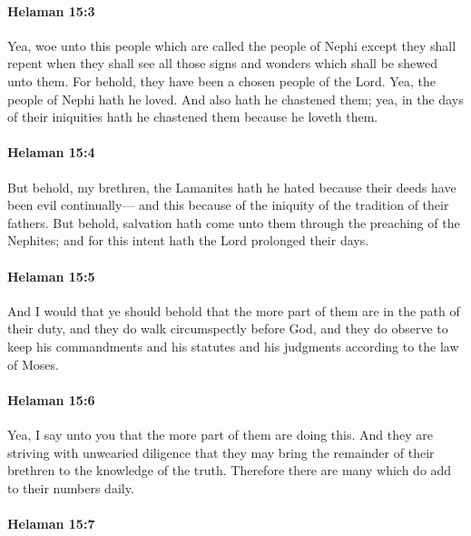 		\paragraph{Helaman 15:3} %
			\label{HELAMAN-15-3}

			Yea, woe unto this people which are called the people of Nephi
			except they shall repent when they shall see all those signs and wonders
			which shall be shewed unto them.
			For behold, they have been a chosen people of the Lord.
			Yea, the people of Nephi hath he loved.
			And also hath he chastened them;
			yea, in the days of their iniquities hath he chastened them because he loveth them.

		\paragraph{Helaman 15:4} %
			\label{HELAMAN-15-4}

			But behold, my brethren, the Lamanites hath he hated
			because their deeds have been evil continually---
			and this because of the iniquity of the tradition of their fathers.
			But behold, salvation hath come unto them through the preaching of the Nephites;
			and for this intent hath the Lord prolonged their days.

		\paragraph{Helaman 15:5} %
			\label{HELAMAN-15-5}

			And I would that ye should behold
			that the more part of them are in the path of their duty,
			and they do walk circumspectly before God,
			and they do observe to keep his commandments
			and his statutes and his judgments
			according to the law of Moses.

		\paragraph{Helaman 15:6} %
			\label{HELAMAN-15-6}

			Yea, I say unto you that the more part of them are doing this.
			And they are striving with unwearied diligence
			that they may bring the remainder of their brethren to the knowledge of the truth.
			Therefore there are many which do add to their numbers daily.

		\paragraph{Helaman 15:7} %
			\label{HELAMAN-15-7}

